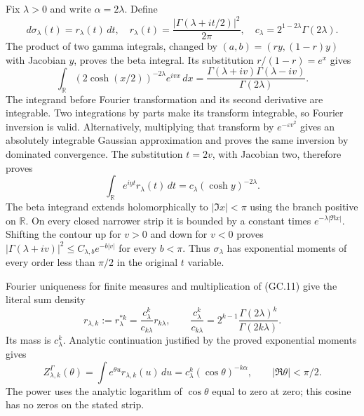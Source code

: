 \documentclass[11pt]{article}
\begin{document}
Fix $\lambda>0$ and write $\alpha=2\lambda$. Define
\[
 d\sigma_\lambda(t)=r_\lambda(t)\,dt,
 \quad r_\lambda(t)=\frac{|\Gamma(\lambda+it/2)|^2}{2\pi},
 \quad c_\lambda=2^{1-2\lambda}\Gamma(2\lambda).
                                                               \tag{GC.10}
\]
The product of two gamma integrals, changed by
$(a,b)=(ry,(1-r)y)$ with Jacobian $y$, proves the beta integral.
Its substitution $r/(1-r)=e^x$ gives
\[
 \int_{\mathbb R}(2\cosh(x/2))^{-2\lambda}e^{ivx}\,dx
 =\frac{\Gamma(\lambda+iv)\Gamma(\lambda-iv)}{\Gamma(2\lambda)}.
\]
The integrand before Fourier transformation and its second derivative
are integrable. Two integrations by parts make its transform
integrable, so Fourier inversion is valid. Alternatively, multiplying
that transform by $e^{-\varepsilon v^2}$ gives an absolutely
integrable Gaussian approximation and proves the same inversion by
dominated convergence. The substitution $t=2v$, with Jacobian two,
therefore proves
\[
 \int_{\mathbb R}e^{iyt}r_\lambda(t)\,dt
       =c_\lambda(\cosh y)^{-2\lambda}.                        \tag{GC.11}
\]
The beta integrand extends holomorphically to $|\Im x|<\pi$ using
the branch positive on $\mathbb R$. On every closed narrower strip
it is bounded by a constant times $e^{-\lambda|\Re x|}$.
Shifting the contour up for $v>0$ and down for $v<0$ proves
$|\Gamma(\lambda+iv)|^2\le C_{\lambda,b}e^{-b|v|}$ for every
$b<\pi$. Thus $\sigma_\lambda$ has exponential moments of every
order less than $\pi/2$ in the original $t$ variable.

Fourier uniqueness for finite measures and multiplication of (GC.11)
give the literal sum density
\[
 r_{\lambda,k}:=r_\lambda^{*k}
   =\frac{c_\lambda^k}{c_{k\lambda}}r_{k\lambda},\qquad
 \frac{c_\lambda^k}{c_{k\lambda}}
   =2^{k-1}\frac{\Gamma(2\lambda)^k}{\Gamma(2k\lambda)}.
                                                               \tag{GC.12}
\]
Its mass is $c_\lambda^k$. Analytic continuation justified by the
proved exponential moments gives
\[
 Z_{\lambda,k}^\Gamma(\theta)
 =\int e^{\theta u}r_{\lambda,k}(u)\,du
 =c_\lambda^k(\cos\theta)^{-k\alpha},
 \qquad |\Re\theta|<\pi/2.                                   \tag{GC.13}
\]
The power uses the analytic logarithm of $\cos\theta$ equal to zero
at zero; this cosine has no zeros on the stated strip.
\end{document}
